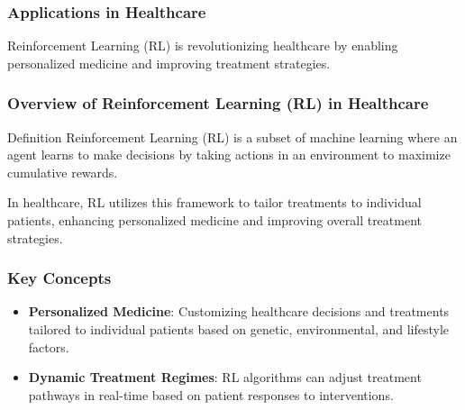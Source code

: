 \documentclass[aspectratio=169]{beamer}
\begin{document}
\begin{frame}[fragile]
  \frametitle{Applications in Healthcare}
  Reinforcement Learning (RL) is revolutionizing healthcare by enabling personalized medicine and improving treatment strategies. 
\end{frame}

\begin{frame}[fragile]
  \frametitle{Overview of Reinforcement Learning (RL) in Healthcare}
  \begin{block}{Definition}
    Reinforcement Learning (RL) is a subset of machine learning where an agent learns to make decisions by taking actions in an environment to maximize cumulative rewards.
  \end{block}
  In healthcare, RL utilizes this framework to tailor treatments to individual patients, enhancing personalized medicine and improving overall treatment strategies.
\end{frame}

\begin{frame}[fragile]
  \frametitle{Key Concepts}
  \begin{itemize}
    \item \textbf{Personalized Medicine}: Customizing healthcare decisions and treatments tailored to individual patients based on genetic, environmental, and lifestyle factors.
    \item \textbf{Dynamic Treatment Regimes}: RL algorithms can adjust treatment pathways in real-time based on patient responses to interventions.
  \end{itemize}
\end{frame}
\end{document}
